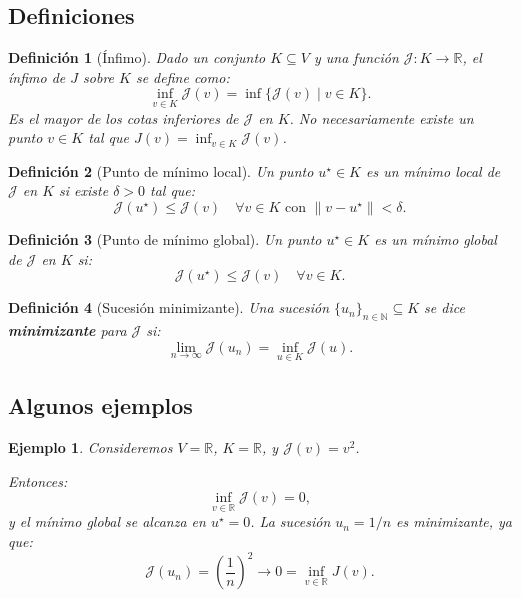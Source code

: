 \documentclass[12pt]{book}
\newtheorem{definition}{Definición}
\newtheorem{ex}{Ejemplo}
\theoremstyle{definition}
\theoremstyle{plain}
\theoremstyle{remark}
\begin{document}
\subsection{Definiciones} %

\begin{definition}[Ínfimo]
Dado un conjunto $K \subseteq V$ y una función $\mathcal{J}: K \to \mathbb{R}$, el \emph{ínfimo} de $J$ sobre $K$ se define como:
\[
\inf_{v \in K} 
\mathcal{J}(v) 
= \inf \{ \mathcal{J}(v) 
\mid v \in K \}.
\]
Es el mayor de los cotas inferiores de $\mathcal{J}$ en $K$. No necesariamente existe un punto $v \in K$ tal que $J(v) = \inf_{v \in K} \mathcal{J}(v)$.
\end{definition}

\begin{definition}[Punto de mínimo local]
Un punto $u^\star \in K$ es un \emph{mínimo local} de $\mathcal{J}$ en $K$ si existe $\delta > 0$ tal que:
\[
\mathcal{J}(u^\star) \leq \mathcal{J}(v) \quad \forall v \in K \text{ con } \|v - u^\star\| < \delta.
\]
\end{definition}

\begin{definition}[Punto de mínimo global]
Un punto $u^\star \in K$ es un \emph{mínimo global} de $\mathcal{J}$ en $K$ si:
\[
\mathcal{J}(u^\star) \leq \mathcal{J}(v) \quad \forall v \in K.
\]
\end{definition}

\begin{definition}[Sucesión minimizante]
Una sucesión $\{u_n\}_{n \in \mathbb{N}} \subseteq K$ se dice \textbf{minimizante} para $\mathcal{J}$ si:
\[
\lim_{n \to \infty} \mathcal{J}(u_n) = \inf_{u \in K} \mathcal{J}(u).
\]
\end{definition}

\subsection{Algunos ejemplos}

\begin{ex}
Consideremos $V = \mathbb{R}$, $K = \mathbb{R}$, y $\mathcal{J}(v) = v^2$. 

\medskip

Entonces:
\[
\inf_{v \in \mathbb{R}} \mathcal{J}(v) = 0,
\]
y el mínimo global se alcanza en $u^\star = 0$. La sucesión $u_n = {1}/{n}$ es minimizante, ya que:
\[
\mathcal{J}(u_n) = \left(\frac{1}{n}\right)^2 \to 0 = \inf_{v \in \mathbb{R}} J(v).
\]
\end{ex}
\end{document}
